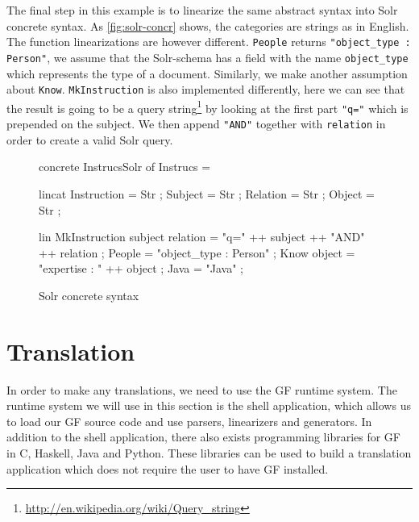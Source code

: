 
The final step in this example is to linearize the same abstract syntax into Solr concrete syntax.
  As \autoref{fig:solr-concr} shows, the categories are strings as in English. The function linearizations are however
  different. \texttt{People} returns 
  \texttt{"object\_type : Person"}, we assume that 
  the Solr-schema has a field with the name \texttt{object\_type} which represents 
  the type of a document. Similarly, we make another assumption about \texttt{Know}. \texttt{MkInstruction} is also implemented differently, here we can see that the result is going to be a query string\footnote{\url{http://en.wikipedia.org/wiki/Query\_string}} by looking at the first part \texttt{"q="} which is prepended on the subject. We then append \texttt{"AND"} together with \texttt{relation} in order to create a valid Solr query.

\begin{figure}[H]
\begin{code}
concrete InstrucsSolr of Instrucs = {
    lincat
      Instruction = Str ;
      Subject = Str ;
      Relation = Str ;
      Object = Str ;

    lin
      MkInstruction subject relation = "q=" ++ subject ++ "AND" ++ relation ;
      People = "object_type : Person" ;
      Know object = "expertise : " ++ object ;
      Java = "Java" ;
}
\end{code}
\caption{Solr concrete syntax\label{fig:solr-concr}}
\end{figure}

\section{Translation}

In order to make any translations, we need to use the GF runtime system. The  runtime system we will use in this section is the shell application, which allows us to load our GF source code and use parsers, linearizers and generators. In addition to the shell application, there also exists programming libraries for GF in C, Haskell, Java and Python. These libraries can be used to build a translation application which does not require the user to have GF installed.

